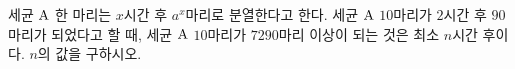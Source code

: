 세균 $\mathrm{A}$ 한 마리는 $x$시간 후 $a^x$마리로 분열한다고 한다. 세균 $\mathrm{A}$ $10$마리가 $2$시간 후 $90$마리가 되었다고 할 때, 세균 $\mathrm{A}$ $10$마리가 $7290$마리 이상이 되는 것은 최소 $n$시간 후이다. $n$의 값을 구하시오. 
